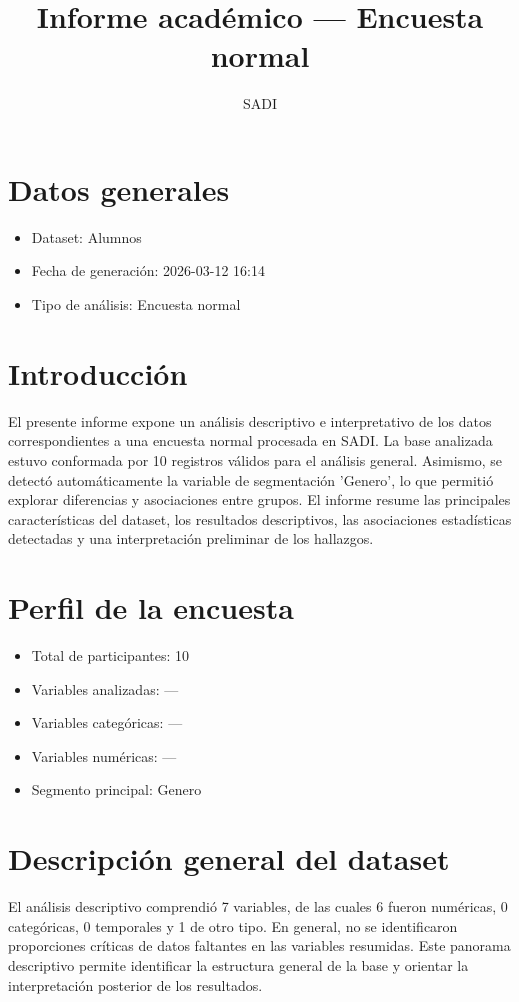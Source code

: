 \documentclass[12pt,a4paper]{article}
\title{Informe académico — Encuesta normal}
\author{SADI}
\date{}
\begin{document}
\maketitle
\section*{Datos generales}
\begin{itemize}
\item Dataset: Alumnos
\item Fecha de generación: 2026-03-12 16:14
\item Tipo de análisis: Encuesta normal
\end{itemize}
\section{Introducción}
El presente informe expone un análisis descriptivo e interpretativo de los datos correspondientes a una encuesta normal procesada en SADI. La base analizada estuvo conformada por 10 registros válidos para el análisis general. Asimismo, se detectó automáticamente la variable de segmentación 'Genero', lo que permitió explorar diferencias y asociaciones entre grupos. El informe resume las principales características del dataset, los resultados descriptivos, las asociaciones estadísticas detectadas y una interpretación preliminar de los hallazgos.
\section{Perfil de la encuesta}
\begin{itemize}
\item Total de participantes: 10
\item Variables analizadas: —
\item Variables categóricas: —
\item Variables numéricas: —
\item Segmento principal: Genero
\end{itemize}
\section{Descripción general del dataset}
El análisis descriptivo comprendió 7 variables, de las cuales 6 fueron numéricas, 0 categóricas, 0 temporales y 1 de otro tipo. En general, no se identificaron proporciones críticas de datos faltantes en las variables resumidas. Este panorama descriptivo permite identificar la estructura general de la base y orientar la interpretación posterior de los resultados.
\end{document}

